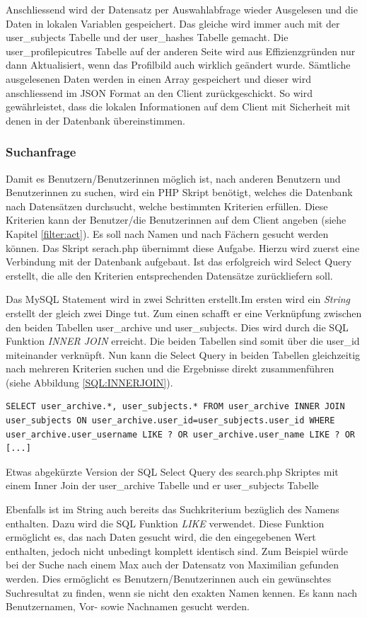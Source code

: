 \documentclass[a4paper,11pt]{report}
\newenvironment{code}{\captionsetup{type=figure}}{}
\begin{document}
					Anschliessend wird der Datensatz per Auswahlabfrage wieder Ausgelesen und die Daten in lokalen Variablen gespeichert. Das gleiche wird immer auch mit der user\_subjects Tabelle und der user\_hashes Tabelle gemacht. Die user\_profilepicutres Tabelle auf der anderen Seite wird aus Effizienzgründen nur dann Aktualisiert, wenn das Profilbild auch wirklich geändert wurde. Sämtliche ausgelesenen Daten werden in einen Array gespeichert und dieser wird anschliessend im JSON Format an den Client zurückgeschickt. So wird gewährleistet, dass die lokalen Informationen auf dem Client mit Sicherheit mit denen in der Datenbank übereinstimmen.
					
					\subsubsection{Suchanfrage} \label{sssec:Suchanfrage}
					Damit es Benutzern/Benutzerinnen möglich ist, nach anderen Benutzern und Benutzerinnen zu suchen, wird ein PHP Skript benötigt, welches die Datenbank nach Datensätzen durchsucht, welche bestimmten Kriterien erfüllen. Diese Kriterien kann der Benutzer/die Benutzerinnen auf dem Client angeben (siehe Kapitel \ref{filter:act}). Es soll nach Namen und nach Fächern gesucht werden können. Das Skript serach.php übernimmt diese Aufgabe. Hierzu wird zuerst eine Verbindung mit der Datenbank aufgebaut. Ist das erfolgreich wird Select Query erstellt, die alle den Kriterien entsprechenden Datensätze zurückliefern soll. 
					
					Das MySQL Statement wird in zwei Schritten erstellt.Im ersten wird ein \emph{String} erstellt der gleich zwei Dinge tut. Zum einen schafft er eine Verknüpfung zwischen den beiden Tabellen user\_archive und user\_subjects. Dies wird durch die SQL Funktion \emph{INNER JOIN} erreicht. Die beiden Tabellen sind somit über die user\_id miteinander verknüpft. Nun kann die Select Query in beiden Tabellen gleichzeitig nach mehreren Kriterien suchen und die Ergebnisse direkt zusammenführen (siehe Abbildung \ref{SQL:INNERJOIN}).
\begin{code}
\begin{verbatim}
SELECT user_archive.*, user_subjects.* FROM user_archive INNER JOIN user_subjects ON user_archive.user_id=user_subjects.user_id WHERE user_archive.user_username LIKE ? OR user_archive.user_name LIKE ? OR [...]
\end{verbatim}
	\caption{Etwas abgekürzte Version der SQL Select Query des search.php Skriptes mit einem Inner Join der user\_archive Tabelle und er user\_subjects Tabelle}
	\label{SQL:INNERJOIN}
\end{code}	
					Ebenfalls ist im String auch bereits das Suchkriterium bezüglich des Namens enthalten. Dazu wird die SQL Funktion \emph{LIKE} verwendet. Diese Funktion ermöglicht es, das nach Daten gesucht wird, die den eingegebenen Wert enthalten, jedoch nicht unbedingt komplett identisch sind. Zum Beispiel würde bei der Suche nach einem \glqq Max\grqq{} auch der Datensatz von \glqq Maximilian\grqq{} gefunden werden. Dies ermöglicht es Benutzern/Benutzerinnen auch ein gewünschtes Suchresultat zu finden, wenn sie nicht den exakten Namen kennen. Es kann nach Benutzernamen, Vor- sowie Nachnamen gesucht werden.
					
\end{document}

